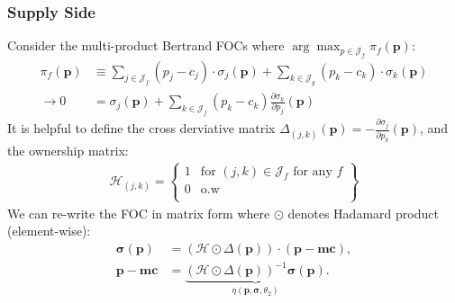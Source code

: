 \begin{frame}
\frametitle{Supply Side}
\small
Consider the multi-product Bertrand FOCs where $\arg \max_{p \in \mathcal{J}_f} \pi_f (\mathbf{p})$:
{\begin{align*}
\pi_f (\mathbf{p}) &\equiv \sum_{j \in \mathcal{J}_f} (p_j - c_j) \cdot \sigma_j(\mathbf{p}) + \sum_{k \in \mathcal{J}_g} (p_k - c_k) \cdot \sigma_k(\mathbf{p}) \\
\rightarrow 0&= \sigma_j(\mathbf{p}) + \sum_{k \in \mathcal{J}_f} (p_k - c_k) \frac{\partial \sigma_{k}}{\partial p_j}(\mathbf{p}) 
\end{align*}
}
It is helpful to define the \alert{cross derviative matrix} $\Delta_{(j,k)}(\mathbf{p})  = - \frac{\partial \sigma_{j}}{\partial p_k}(\mathbf{p})$, and the \alert{ownership matrix}:
\begin{align*}
\mathcal{H}_{(j,k)} = \left\{\begin{array}{lr}
          1 & \text{for }  (j,k) \in \mathcal{J}_f \text{ for any } f \\ 
      0 & \text{o.w}\\
        \end{array} \right\}
\end{align*}
We can re-write the FOC in matrix form where $\odot$ denotes Hadamard product (element-wise):
\begin{align*}
        \boldsymbol{\sigma}(\mathbf{p}) &= (\mathcal{H} \odot \Delta(\mathbf{p})) \cdot (\mathbf{p} - \mathbf{mc}), \\
       \mathbf{p}-\mathbf{mc} &=  \underbrace{(\mathcal{H} \odot \Delta(\mathbf{p}))^{-1} \boldsymbol{\sigma}(\mathbf{p})}_{\eta(\mathbf{p},\boldsymbol{\sigma},\theta_2)}.
\end{align*}
\end{frame}



